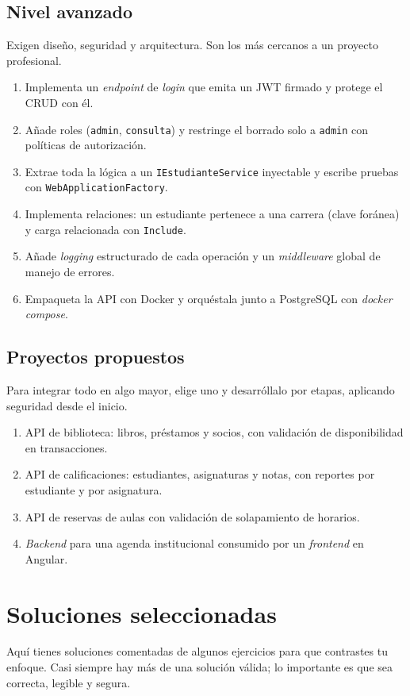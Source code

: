 \documentclass[11pt]{article}
\begin{document}
\subsection{Nivel avanzado}
Exigen diseño, seguridad y arquitectura. Son los más cercanos a un proyecto profesional.

\begin{enumerate}[leftmargin=1.7em,itemsep=3pt,topsep=2pt]
\item Implementa un \emph{endpoint} de \emph{login} que emita un JWT firmado y protege el CRUD con él.
\item Añade roles (\texttt{admin}, \texttt{consulta}) y restringe el borrado solo a \texttt{admin} con políticas de autorización.
\item Extrae toda la lógica a un \texttt{IEstudianteService} inyectable y escribe pruebas con \texttt{WebApplicationFactory}.
\item Implementa relaciones: un estudiante pertenece a una carrera (clave foránea) y carga relacionada con \texttt{Include}.
\item Añade \emph{logging} estructurado de cada operación y un \emph{middleware} global de manejo de errores.
\item Empaqueta la API con Docker y orquéstala junto a PostgreSQL con \emph{docker compose}.
\end{enumerate}

\subsection{Proyectos propuestos}
Para integrar todo en algo mayor, elige uno y desarróllalo por etapas, aplicando seguridad desde el inicio.

\begin{enumerate}[leftmargin=1.7em,itemsep=3pt,topsep=2pt]
\item API de biblioteca: libros, préstamos y socios, con validación de disponibilidad en transacciones.
\item API de calificaciones: estudiantes, asignaturas y notas, con reportes por estudiante y por asignatura.
\item API de reservas de aulas con validación de solapamiento de horarios.
\item \emph{Backend} para una agenda institucional consumido por un \emph{frontend} en Angular.
\end{enumerate}

\section{Soluciones seleccionadas}
Aquí tienes soluciones comentadas de algunos ejercicios para que contrastes tu enfoque. Casi siempre hay más de una solución válida; lo importante es que sea correcta, legible y segura.
\end{document}
